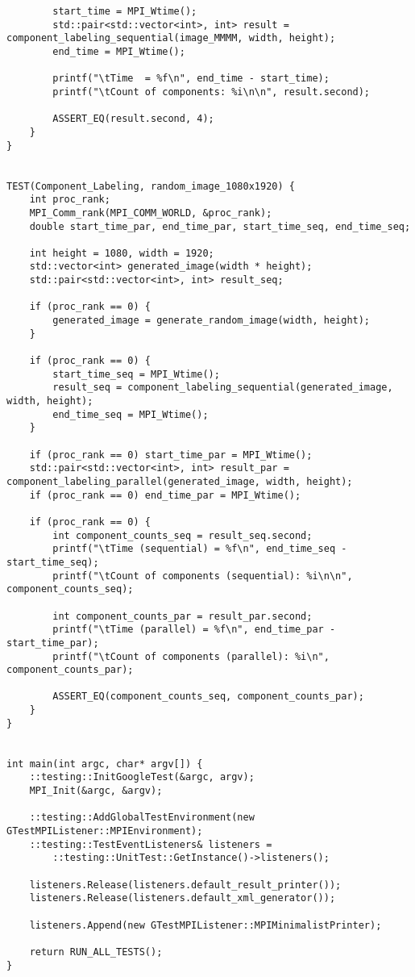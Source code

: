 \documentclass{report}
\begin{document}
\begin{lstlisting}
        start_time = MPI_Wtime();
        std::pair<std::vector<int>, int> result = component_labeling_sequential(image_MMMM, width, height);
        end_time = MPI_Wtime();

        printf("\tTime  = %f\n", end_time - start_time);
        printf("\tCount of components: %i\n\n", result.second);

        ASSERT_EQ(result.second, 4);
    }
}


TEST(Component_Labeling, random_image_1080x1920) {
    int proc_rank;
    MPI_Comm_rank(MPI_COMM_WORLD, &proc_rank);
    double start_time_par, end_time_par, start_time_seq, end_time_seq;

    int height = 1080, width = 1920;
    std::vector<int> generated_image(width * height);
    std::pair<std::vector<int>, int> result_seq;

    if (proc_rank == 0) {
        generated_image = generate_random_image(width, height);
    }

    if (proc_rank == 0) {
        start_time_seq = MPI_Wtime();
        result_seq = component_labeling_sequential(generated_image, width, height);
        end_time_seq = MPI_Wtime();
    }

    if (proc_rank == 0) start_time_par = MPI_Wtime();
    std::pair<std::vector<int>, int> result_par = component_labeling_parallel(generated_image, width, height);
    if (proc_rank == 0) end_time_par = MPI_Wtime();

    if (proc_rank == 0) {
        int component_counts_seq = result_seq.second;
        printf("\tTime (sequential) = %f\n", end_time_seq - start_time_seq);
        printf("\tCount of components (sequential): %i\n\n", component_counts_seq);

        int component_counts_par = result_par.second;
        printf("\tTime (parallel) = %f\n", end_time_par - start_time_par);
        printf("\tCount of components (parallel): %i\n", component_counts_par);

        ASSERT_EQ(component_counts_seq, component_counts_par);
    }
}


int main(int argc, char* argv[]) {
    ::testing::InitGoogleTest(&argc, argv);
    MPI_Init(&argc, &argv);

    ::testing::AddGlobalTestEnvironment(new GTestMPIListener::MPIEnvironment);
    ::testing::TestEventListeners& listeners =
        ::testing::UnitTest::GetInstance()->listeners();

    listeners.Release(listeners.default_result_printer());
    listeners.Release(listeners.default_xml_generator());

    listeners.Append(new GTestMPIListener::MPIMinimalistPrinter);

    return RUN_ALL_TESTS();
}
	\end{lstlisting}
\end{document}
